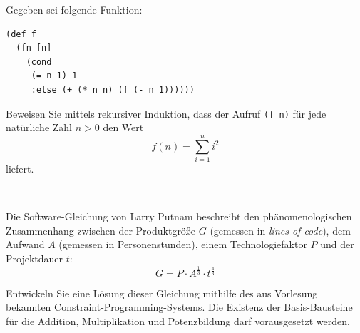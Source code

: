 \documentclass[12pt]{exam}
\begin{document}
\begin{questions}

\question[10]
Gegeben sei folgende Funktion:
\begin{verbatim}
(def f
  (fn [n]
    (cond
     (= n 1) 1
     :else (+ (* n n) (f (- n 1))))))
\end{verbatim}
Beweisen Sie mittels rekursiver Induktion, dass der Aufruf \verb|(f n)| für jede natürliche Zahl $n>0$ 
den Wert
\[f(n)=\sum_{i=1}^{n}i^{2}\]
liefert.

\pagebreak
\  

\pagebreak

\question Die Software-Gleichung von Larry Putnam beschreibt den
phänomenologischen Zusammenhang zwischen der Produktgröße $G$
(gemessen in \emph{lines of code}), dem Aufwand $A$ (gemessen in
Personenstunden), einem Technologiefaktor $P$ und der Projektdauer
$t$:
$$ G = P \cdot A^{\frac{1}{3}} \cdot  t^{\frac{4}{3}}$$ 

Entwickeln Sie eine Lösung dieser Gleichung mithilfe des aus Vorlesung
bekannten Constraint-Programming-Systems. Die Existenz der
Basis-Bausteine für die Addition, Multiplikation und Potenzbildung
darf vorausgesetzt werden.

\end{questions}
\end{document}
